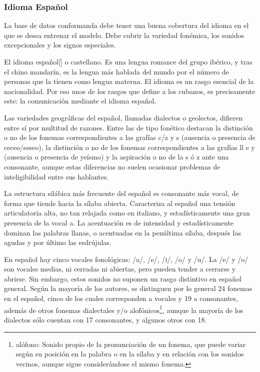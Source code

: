 \subsubsection{Idioma Español}
La base de datos conformanda debe tener una buena cobertura del idioma en el que se desea entrenar el modelo. Debe cubrir la variedad fonémica, los sonidos excepcionales y los signos especiales.

El idioma español[\cite{ecured}] o castellano. Es una lengua romance del grupo ibérico, y tras el chino mandarín, es la lengua más hablada del mundo por el número de personas que la tienen como lengua materna. El idioma es un rasgo esencial de la nacionalidad. Por eso unos de los rasgos que define a los cubanos, es precisamente este: la comunicación mediante el idioma español. 

Las variedades geográficas del español, llamadas dialectos o geolectos, difieren entre sí por multitud de razones. Entre las de tipo fonético destacan la distinción o no de los fonemas correspondientes a las grafías c/z y s (ausencia o presencia de ceceo/seseo), la distinción o no de los fonemas correspondientes a las grafías ll e y (ausencia o presencia de yeísmo) y la aspiración o no de la s ó z ante una consonante, aunque estas diferencias no suelen ocasionar problemas de inteligibilidad entre sus hablantes.

La estructura silábica más frecuente del español es consonante más vocal, de forma que tiende hacia la sílaba abierta. Caracteriza al español una tensión articulatoria alta, no tan relajada como en italiano, y estadísticamente una gran presencia de la vocal a. La acentuación es de intensidad y estadísticamente dominan las palabras llanas, o acentuadas en la penúltima sílaba, después las agudas y por último las esdrújulas. 

En español hay cinco vocales fonológicas: /a/, /e/, /i/, /o/ y /u/. La /e/ y /o/ son vocales medias, ni cerradas ni abiertas, pero pueden tender a cerrarse y abrirse. Sin embargo, estos sonidos no suponen un rasgo distintivo en español general. Según la mayoría de los autores, se distinguen por lo general 24 fonemas en el español, cinco de los cuales corresponden a vocales y 19 a consonantes, además de otros fonemas dialectales y/o alofónicos\footnote{alófono: Sonido propio de la pronunciación de un fonema, que puede variar según su posición en la palabra o en la sílaba y en relación con los sonidos vecinos, aunque sigue considerándose el mismo fonema.}, aunque la mayoría de los dialectos sólo cuentan con 17 consonantes, y algunos otros con 18.


